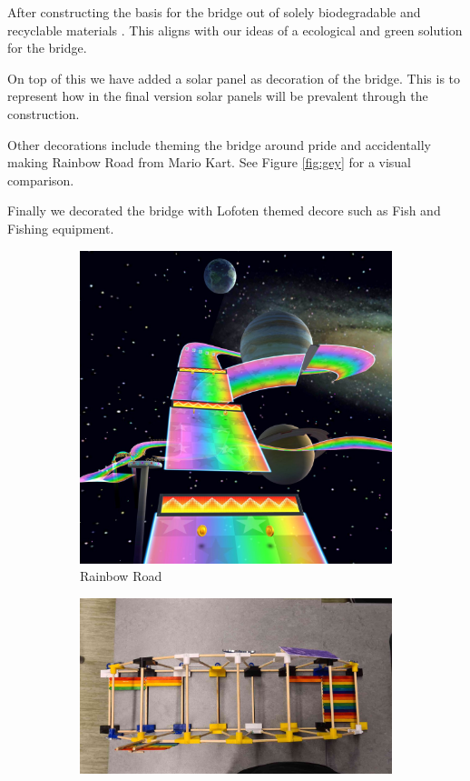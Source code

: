 \documentclass{report}
\newcommand{\subimgw}{.7\linewidth}
\begin{document}
After constructing the basis for the bridge out of solely biodegradable and recyclable materials \cite{wiki:pla}. This aligns with our ideas of a ecological and green solution for the bridge.

On top of this we have added a solar panel as decoration of the bridge. This is to represent how in the final version solar panels will be prevalent through the construction.

Other decorations include theming the bridge around pride and accidentally making Rainbow Road from Mario Kart. See Figure \ref{fig:gey} for a visual comparison.

Finally we decorated the bridge with Lofoten themed decore such as Fish and Fishing equipment.

\begin{figure}[H]
	\begin{subfigure}{.5\textwidth}
		\centering
		\includegraphics[width=\subimgw,trim={0 10cm 0 0},clip]{rainbow-road}

		\caption{Rainbow Road}
	\end{subfigure}%
	\begin{subfigure}{.5\textwidth}
		\centering
		\includegraphics[width=\subimgw,trim={0 0 0 0},clip]{top}


\end{subfigure}
\end{figure}
\end{document}
